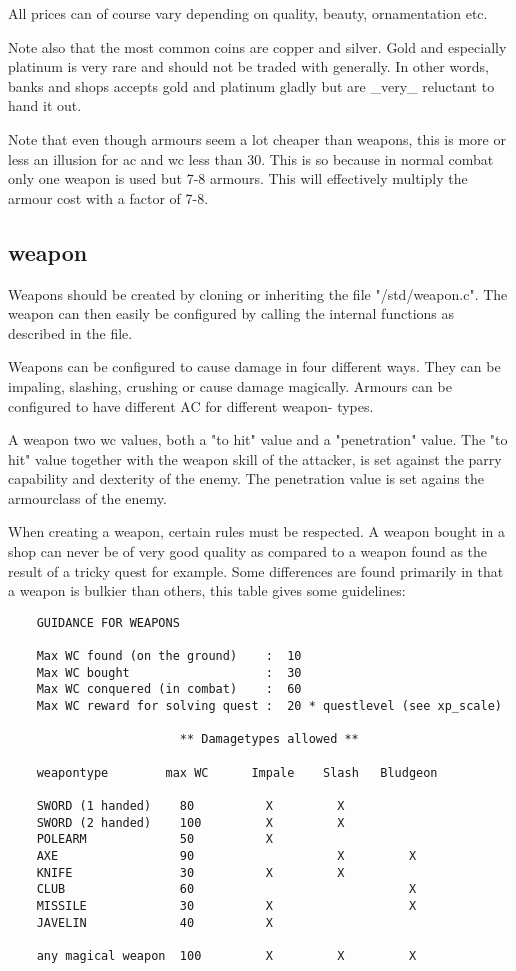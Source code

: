 All prices can of course vary depending on quality, beauty, ornamentation etc.

Note also that the most common coins are copper and silver. Gold and
especially platinum is very rare and should not be traded with generally.
In other words, banks and shops accepts gold and platinum gladly but are
\_very\_ reluctant to hand it out.

Note that even though armours seem a lot cheaper than weapons, this is
more or less an illusion for ac and wc less than 30. This is so because
in normal combat only one weapon is used but 7-8 armours. This will
effectively multiply the armour cost with a factor of 7-8.


\subsection{weapon}

Weapons should be created by cloning or inheriting the file
"/std/weapon.c". The weapon can then easily be configured by calling
the internal functions as described in the file.

Weapons can be configured to cause damage in four different ways.
They can be impaling, slashing, crushing or cause damage magically.
Armours can be configured to have different AC for different weapon-
types.

A weapon two wc values, both a "to hit" value and a "penetration" value. The
"to hit" value together with the weapon skill of the attacker, is
set against the parry capability and dexterity of the enemy.
The penetration value is set agains the armourclass of the enemy. 

When creating a weapon, certain rules must be respected. A weapon
bought in a shop can never be of very good quality as compared to a
weapon found as the result of a tricky quest for example. Some
differences are found primarily in that a weapon is bulkier than
others, this table gives some guidelines:

\begin{verbatim}
    GUIDANCE FOR WEAPONS

    Max WC found (on the ground)    :  10
    Max WC bought                   :  30
    Max WC conquered (in combat)    :  60
    Max WC reward for solving quest :  20 * questlevel (see xp_scale)
    
                        ** Damagetypes allowed **
                        
    weapontype        max WC      Impale    Slash   Bludgeon 

    SWORD (1 handed)    80          X         X              
    SWORD (2 handed)    100         X         X              
    POLEARM             50          X                        
    AXE                 90                    X         X    
    KNIFE               30          X         X              
    CLUB                60                              X    
    MISSILE             30          X                   X    
    JAVELIN             40          X                        

    any magical weapon  100         X         X         X    
\end{verbatim}

